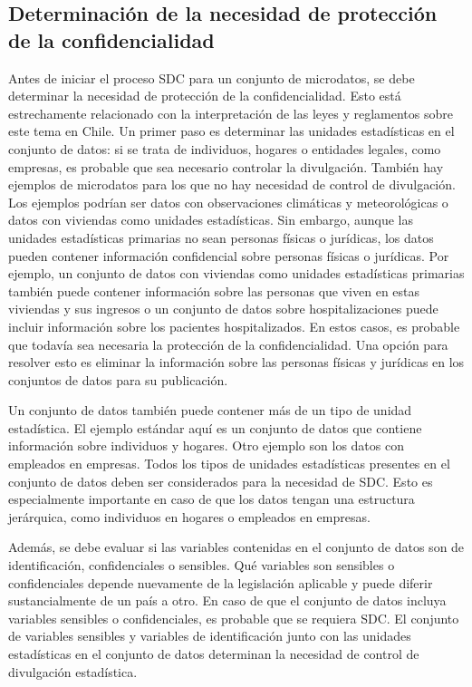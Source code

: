 \documentclass[]{book}
\theoremstyle{definition}
\theoremstyle{definition}
\theoremstyle{definition}
\theoremstyle{definition}
\theoremstyle{remark}
\begin{document}
\hypertarget{determinaciuxf3n-de-la-necesidad-de-protecciuxf3n-de-la-confidencialidad}{%
\subsection{Determinación de la necesidad de protección de la confidencialidad}\label{determinaciuxf3n-de-la-necesidad-de-protecciuxf3n-de-la-confidencialidad}}

Antes de iniciar el proceso SDC para un conjunto de microdatos, se debe determinar la necesidad de protección de la confidencialidad. Esto está estrechamente relacionado con la interpretación de las leyes y reglamentos sobre este tema en Chile. Un primer paso es determinar las unidades estadísticas en el conjunto de datos: si se trata de individuos, hogares o entidades legales, como empresas, es probable que sea necesario controlar la divulgación. También hay ejemplos de microdatos para los que no hay necesidad de control de divulgación. Los ejemplos podrían ser datos con observaciones climáticas y meteorológicas o datos con viviendas como unidades estadísticas. Sin embargo, aunque las unidades estadísticas primarias no sean personas físicas o jurídicas, los datos pueden contener información confidencial sobre personas físicas o jurídicas. Por ejemplo, un conjunto de datos con viviendas como unidades estadísticas primarias también puede contener información sobre las personas que viven en estas viviendas y sus ingresos o un conjunto de datos sobre hospitalizaciones puede incluir información sobre los pacientes hospitalizados. En estos casos, es probable que todavía sea necesaria la protección de la confidencialidad. Una opción para resolver esto es eliminar la información sobre las personas físicas y jurídicas en los conjuntos de datos para su publicación.

Un conjunto de datos también puede contener más de un tipo de unidad estadística. El ejemplo estándar aquí es un conjunto de datos que contiene información sobre individuos y hogares. Otro ejemplo son los datos con empleados en empresas. Todos los tipos de unidades estadísticas presentes en el conjunto de datos deben ser considerados para la necesidad de SDC. Esto es especialmente importante en caso de que los datos tengan una estructura jerárquica, como individuos en hogares o empleados en empresas.

Además, se debe evaluar si las variables contenidas en el conjunto de datos son de identificación, confidenciales o sensibles. Qué variables son sensibles o confidenciales depende nuevamente de la legislación aplicable y puede diferir sustancialmente de un país a otro. En caso de que el conjunto de datos incluya variables sensibles o confidenciales, es probable que se requiera SDC. El conjunto de variables sensibles y variables de identificación junto con las unidades estadísticas en el conjunto de datos determinan la necesidad de control de divulgación estadística.
\end{document}
